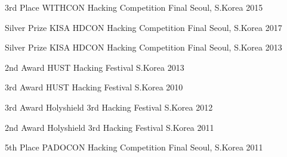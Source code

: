 \begin{cvhonors}

  \cvhonor
  {3rd Place} %
  {WITHCON Hacking Competition Final} %
  {Seoul, S.Korea} %
  {2015} %

  \cvhonor
  {Silver Prize} %
  {KISA HDCON Hacking Competition Final} %
  {Seoul, S.Korea} %
  {2017} %

  \cvhonor
  {Silver Prize} %
  {KISA HDCON Hacking Competition Final} %
  {Seoul, S.Korea} %
  {2013} %

  \cvhonor
  {2nd Award} %
  {HUST Hacking Festival} %
  {S.Korea} %
  {2013} %

  \cvhonor
  {3rd Award} %
  {HUST Hacking Festival} %
  {S.Korea} %
  {2010} %

  \cvhonor
  {3rd Award} %
  {Holyshield 3rd Hacking Festival} %
  {S.Korea} %
  {2012} %

  \cvhonor
  {2nd Award} %
  {Holyshield 3rd Hacking Festival} %
  {S.Korea} %
  {2011} %

  \cvhonor
  {5th Place} %
  {PADOCON Hacking Competition Final} %
  {Seoul, S.Korea} %
  {2011} %

\end{cvhonors}
